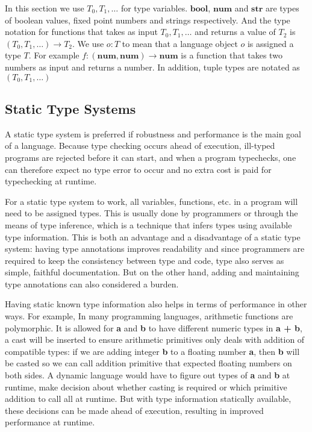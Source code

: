 \newcommand{\tnum}{\textbf{num}}
\newcommand{\tstr}{\textbf{str}}
\newcommand{\tbool}{\textbf{bool}}
\newcommand{\tarr}[2]{#1 \rightarrow #2}

In this section we use $T_0, T_1, \ldots$ for type variables.
$\tbool$, $\tnum$ and $\tstr$ are types of
boolean values, fixed point numbers and strings respectively.
And the type notation for functions that takes as input $T_0, T_1, \ldots$
and returns a value of $T_2$ is $\tarr{(T_0, T_1, \ldots)}{T_2}$.
We use $o : T$ to mean that a language object $o$ is assigned a type $T$.
For example $f : \tarr{(\tnum, \tnum)}{\tnum}$ is a function that
takes two numbers as input and returns a number.
In addition, tuple types are notated as $(T_0, T_1, \ldots)$

\subsection{Static Type Systems}


A static type system is preferred if robustness and performance
is the main goal of a language.
Because type checking occurs ahead of execution,
ill-typed programs are rejected before it can start, and
when a program typechecks,
one can therefore expect no type error to occur and
no extra cost is paid for typechecking at runtime.


For a static type system to work, all variables, functions, etc. in a program
will need to be assigned types. This is usually done by programmers or through the
means of type inference, which is a technique that infers types using
available type information. This is both an advantage and a disadvantage
of a static type system: having type annotations improves readability
and since programmers are required to keep the consistency between type and code,
type also serves as simple, faithful documentation. But on the other hand,
adding and maintaining type annotations can also considered a burden.

Having static known type information also helps in terms of performance in other ways.
For example, In many programming languages, arithmetic functions are polymorphic.
It is allowed for \textbf{a} and \textbf{b} to have different numeric types in \textbf{a + b}, a cast will be inserted to ensure arithmetic primitives only deals with addition of compatible types: if we are adding integer \textbf{b} to a floating number \textbf{a}, then \textbf{b} will be casted so we can call addition primitive that expected floating numbers on both sides.
A dynamic language would have to figure out types of \textbf{a} and \textbf{b} at runtime, make decision about whether casting is required or which primitive addition to call all at runtime. But with type information statically available,
these decisions can be made ahead of execution,
resulting in improved performance at runtime.

